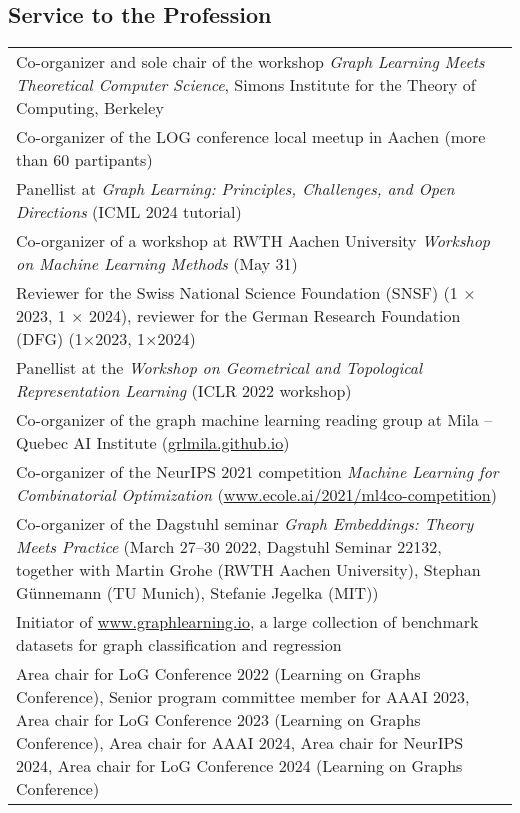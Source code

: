 \documentclass[11pt, a4paper, DIV=14, headings=small]{scrartcl}
\begin{document}
	\subsection*{Service to the Profession}
	\begin{longtabu}{p{14.5cm}} 
		
		Co-organizer and sole chair of the workshop \emph{Graph Learning Meets Theoretical Computer Science}, Simons Institute for the Theory of Computing, Berkeley\\
		
		Co-organizer of the LOG conference local meetup in Aachen (more than 60 partipants)\\
		
		Panellist at \emph{Graph Learning: Principles, Challenges, and Open Directions} (ICML 2024 tutorial) \\
		
		Co-organizer of a workshop at RWTH Aachen University \emph{Workshop on Machine Learning Methods} (May 31) \\
	
	    Reviewer for the Swiss National Science Foundation (SNSF) (1 $\times$ 2023, 1 $\times$ 2024), reviewer for the German Research Foundation (DFG) (1$\times$2023, 1$\times$2024) \\[2.5em]
	    
	    Panellist at the \emph{Workshop on Geometrical and Topological Representation Learning} (ICLR 2022 workshop) \\
		Co-organizer of the graph machine learning reading group at Mila -- Quebec AI Institute (\url{grlmila.github.io}) \\
		
		Co-organizer of the NeurIPS 2021 competition \emph{Machine Learning for Combinatorial Optimization} (\url{www.ecole.ai/2021/ml4co-competition}) \\
		
		Co-organizer of the Dagstuhl seminar \emph{Graph Embeddings: Theory Meets Practice} (March 27–30 2022, Dagstuhl Seminar 22132, together with Martin Grohe (RWTH Aachen University), Stephan Günnemann (TU Munich), Stefanie Jegelka (MIT)) \\
		
		Initiator of \url{www.graphlearning.io}, a large collection of benchmark datasets for graph classification and regression \\
		
		Area chair for LoG Conference 2022 (Learning on Graphs Conference), Senior program committee member for AAAI 2023, Area chair for LoG Conference 2023 (Learning on Graphs Conference), Area chair for AAAI 2024, Area chair for NeurIPS 2024, Area chair for LoG Conference 2024 (Learning on Graphs Conference) \\
		

\end{longtabu}
\end{document}
